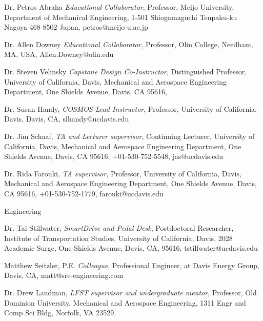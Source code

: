 \documentclass[10pt]{article}
\newenvironment{outerlist}[1][\enskip\textbullet]%
        {\begin{itemize}[#1]}{\end{itemize}%
         \vspace{-.6\baselineskip}}
\newenvironment{innerlist}[1][\enskip\textbullet]%
        {\begin{compactitem}[#1]}{\end{compactitem}}
\begin{document}
\begin{innerlist}
\begin{outerlist}
\begin{innerlist}
      \item Dr. Petros Abraha
        \emph{Educational Collaborator},
        Professor,
        Meijo University,
        Department of Mechanical Engineering,
        1-501 Shiogamaguchi Tenpaku-ku Nagoya 468-8502 Japan,
        petros@meijo-u.ac.jp
      \item Dr. Allen Downey
        \emph{Educational Collaborator},
        Professor,
        Olin College,
        Needham, MA, USA,
        Allen.Downey@olin.edu
      \item Dr. Steven Velinsky
        \emph{Capstone Design Co-Instructor},
        Distinguished Professor,
        University of California, Davis,
        Mechanical and Aerospace Engineering Department,
        One Shields Avenue, Davis, CA 95616,
      \item Dr. Susan Handy,
        \emph{COSMOS Lead Instructor},
        Professor,
        University of California, Davis,
        Davis, CA,
        slhandy@ucdavis.edu
      \item Dr. Jim Schaaf,
        \emph{TA and Lecturer supervisor},
        Continuing Lecturer,
        University of California, Davis,
        Mechanical and Aerospace Engineering Department,
        One Shields Avenue, Davis, CA 95616,
        +01-530-752-5548,
        jas@ucdavis.edu
      \item Dr. Rida Farouki,
        \emph{TA supervisor},
        Professor,
        University of California, Davis,
        Mechanical and Aerospace Engineering Department,
        One Shields Avenue, Davis, CA 95616,
        +01-530-752-1779,
        farouki@ucdavis.edu
    \end{innerlist}
  \item[] Engineering
    \begin{innerlist}
      \item Dr. Tai Stillwater,
        \emph{SmartDrive and Pedal Desk},
        Postdoctoral Researcher,
        Institute of Transportation Studies,
        University of California, Davis,
        2028 Academic Surge, One Shields Avenue, Davis, CA, 95616,
        tstillwater@ucdavis.edu
      \item Matthew Seitzler, P.E. \emph{Colleague},
        Professional Engineer, at Davis Energy Group, Davis, CA,
        matt@sre-engineering.com
      \item Dr. Drew Landman,
        \emph{LFST supervisor and undergraduate mentor},
        Professor,
        Old Dominion University,
        Mechanical and Aerospace Engineering,
        1311 Engr and Comp Sci Bldg, Norfolk, VA 23529,

\end{innerlist}
\end{outerlist}
\end{innerlist}
\end{document}
